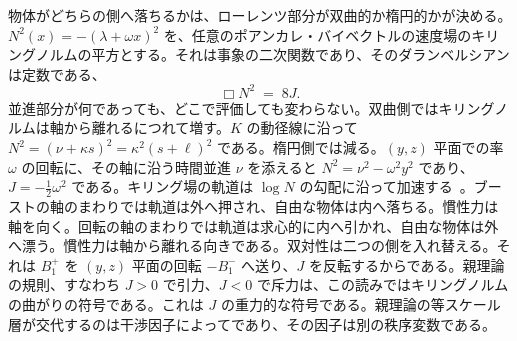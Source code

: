 \documentclass[a4paper]{article}
\begin{document}
物体がどちらの側へ落ちるかは、ローレンツ部分が双曲的か楕円的かが決める。\(N^{2}(x)=-(\lambda+\omega x)^{2}\) を、任意のポアンカレ・バイベクトルの速度場のキリングノルムの平方とする。それは事象の二次関数であり、そのダランベルシアンは定数である、
\begin{equation}
\Box N^{2} \;=\; 8J.
\label{eq:dalembert-J}
\end{equation}
並進部分が何であっても、どこで評価しても変わらない。双曲側ではキリングノルムは軸から離れるにつれて増す。\(K\) の動径線に沿って \(N^{2}=(\nu+\kappa s)^{2}=\kappa^{2}(s+\ell)^{2}\) である。楕円側では減る。\((y,z)\) 平面での率 \(\omega\) の回転に、その軸に沿う時間並進 \(\nu\) を添えると \(N^{2}=\nu^{2}-\omega^{2}y^{2}\) であり、\(J=-\tfrac12\omega^{2}\) である。キリング場の軌道は \(\log N\) の勾配に沿って加速する~\cite{Wald1984}。ブーストの軸のまわりでは軌道は外へ押され、自由な物体は内へ落ちる。慣性力は軸を向く。回転の軸のまわりでは軌道は求心的に内へ引かれ、自由な物体は外へ漂う。慣性力は軸から離れる向きである。双対性は二つの側を入れ替える。それは \(B^{+}_{1}\) を \((y,z)\) 平面の回転 \(-B^{-}_{1}\) へ送り、\(J\) を反転するからである。親理論の規則、すなわち \(J>0\) で引力、\(J<0\) で斥力は、この読みではキリングノルムの曲がりの符号である。これは \(J\) の重力的な符号である。親理論の等スケール層が交代するのは干渉因子によってであり、その因子は別の秩序変数である。
\end{document}
